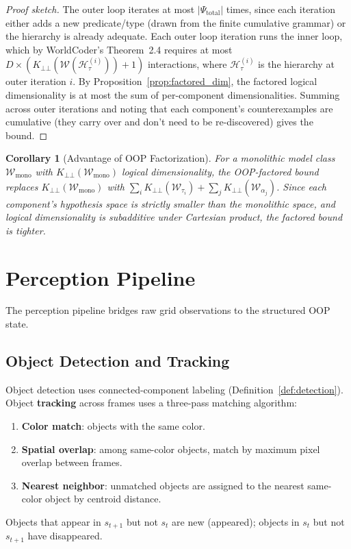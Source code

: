 \documentclass{article}
\newtheorem{corollary}{Corollary}
\newcommand{\calH}{\mathcal{H}}
\newcommand{\calW}{\mathcal{W}}
\begin{document}
\begin{proof}[Proof sketch]
The outer loop iterates at most $|\Psi_{\text{total}}|$ times, since each
iteration either adds a new predicate/type (drawn from the finite cumulative
grammar) or the hierarchy is already adequate.  Each outer loop iteration
runs the inner loop, which by WorldCoder's Theorem~2.4 requires at most
$D \times (K_{\bot\!\!\bot}(\calW(\calH_\tau^{(i)})) + 1)$ interactions,
where $\calH_\tau^{(i)}$ is the hierarchy at outer iteration $i$.  By
Proposition~\ref{prop:factored_dim}, the factored logical dimensionality is
at most the sum of per-component dimensionalities.  Summing across outer
iterations and noting that each component's counterexamples are cumulative
(they carry over and don't need to be re-discovered) gives the bound.
\end{proof}

\begin{corollary}[Advantage of OOP Factorization]
\label{cor:advantage}
For a monolithic model class $\calW_{\text{mono}}$ with
$K_{\bot\!\!\bot}(\calW_{\text{mono}})$ logical dimensionality, the
OOP-factored bound replaces $K_{\bot\!\!\bot}(\calW_{\text{mono}})$ with
$\sum_i K_{\bot\!\!\bot}(\calW_{\tau_i}) + \sum_j K_{\bot\!\!\bot}(\calW_{\alpha_j})$.
Since each component's hypothesis space is strictly smaller than the monolithic
space, and logical dimensionality is subadditive under Cartesian product, the
factored bound is tighter.
\end{corollary}



\section{Perception Pipeline}
\label{sec:perception}

The perception pipeline bridges raw grid observations to the structured OOP
state.

\subsection{Object Detection and Tracking}
\label{sec:tracking}

Object detection uses connected-component labeling
(Definition~\ref{def:detection}).  Object \textbf{tracking} across frames
uses a three-pass matching algorithm:
\begin{enumerate}[nosep]
    \item \textbf{Color match}: objects with the same color.
    \item \textbf{Spatial overlap}: among same-color objects, match by
          maximum pixel overlap between frames.
    \item \textbf{Nearest neighbor}: unmatched objects are assigned to the
          nearest same-color object by centroid distance.
\end{enumerate}
Objects that appear in $s_{t+1}$ but not $s_t$ are new (appeared); objects
in $s_t$ but not $s_{t+1}$ have disappeared.
\end{document}
